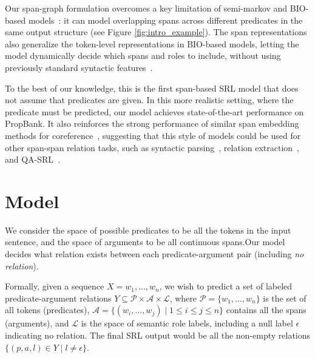 \documentclass[11pt,a4paper]{article}
\begin{document}
Our span-graph formulation overcomes a key limitation of semi-markov and BIO-based models~\cite{kong2015segmental,zhou2015end,Yang2017AJS,He2017DeepSR,tan2018deep}: it can model overlapping spans across different predicates in the same output structure (see Figure \ref{fig:intro_example}).
The span representations also generalize the token-level representations in BIO-based models, letting the model dynamically decide which spans and roles to include, without using previously standard syntactic features~\cite{punyakanok2008importance,fitzgerald2015semantic}. 

To the best of our knowledge, this is the first span-based SRL model that does not assume that predicates are given. In this more realistic setting, where the predicate must be predicted, our model achieves state-of-the-art performance on PropBank.
It also reinforces the strong performance of similar span embedding methods for coreference~\cite{Lee2017EndtoendNC}, suggesting that this style of models could be used for other span-span relation tasks, 
such as syntactic parsing~\cite{stern2017minimal},
relation extraction~\cite{miwa2016end}, and QA-SRL~\cite{fitzgerald2018large}.
 

\section{Model}\label{sec:model}

We consider the space of possible predicates to be all the tokens in the input sentence, and the space of arguments to be all continuous spans.Our model decides what relation exists between each predicate-argument pair (including \textit{no relation}).

Formally, given a sequence $X=w_1,\dots,w_n$, we wish to predict a set of labeled predicate-argument relations $Y \subseteq \mathcal{P}\times \mathcal{A}\times\mathcal{L}$,
where $\mathcal{P}=\{w_1,\ldots, w_n\}$ is the set of all tokens (predicates), $\mathcal{A} = \{(w_i,\dots,w_j) \mid 1 \leq i \leq j \leq n \}$ contains all the spans (arguments), and $\mathcal{L}$ is the space of semantic role labels, including a null label $\epsilon$ indicating no relation. The final SRL output would be all the non-empty relations $\{(p,a,l)\in Y \mid l \neq \epsilon\}$.
\end{document}
